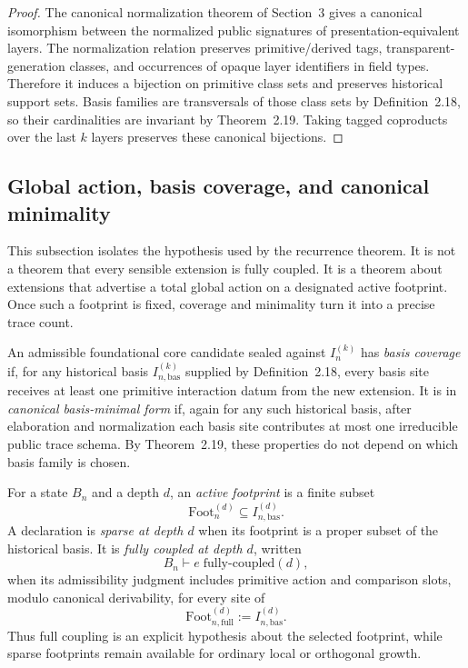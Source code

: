 \begin{proof}
The canonical normalization theorem of Section~3 gives a canonical isomorphism between the
normalized public signatures of presentation-equivalent layers.  The normalization relation
preserves primitive/derived tags, transparent-generation classes, and occurrences of opaque
layer identifiers in field types.  Therefore it induces a bijection on primitive class sets and
preserves historical support sets.  Basis families are transversals of those class sets by
Definition~2.18, so their cardinalities are invariant by Theorem~2.19.  Taking tagged
coproducts over the last \(k\) layers preserves these canonical bijections.
\end{proof}

\subsection{Global action, basis coverage, and canonical minimality}

This subsection isolates the hypothesis used by the recurrence theorem.  It is not a theorem
that every sensible extension is fully coupled.  It is a theorem about extensions that advertise
a total global action on a designated active footprint.  Once such a footprint is fixed,
coverage and minimality turn it into a precise trace count.

\begin{definition}
An admissible foundational core candidate sealed against \(I_n^{(k)}\) has \emph{basis
coverage} if, for any historical basis \(I_{n,\mathrm{bas}}^{(k)}\) supplied by
Definition~2.18, every basis site receives at least one primitive interaction datum from the
new extension.  It is in \emph{canonical basis-minimal form} if, again for any such historical
basis, after elaboration and normalization each basis site contributes at most one irreducible
public trace schema.  By Theorem~2.19, these properties do not depend on which basis family
is chosen.
\end{definition}

\begin{definition}
For a state \(B_n\) and a depth \(d\), an \emph{active footprint} is a finite subset
\[
  \mathrm{Foot}^{(d)}_n \subseteq I_{n,\mathrm{bas}}^{(d)}.
\]
A declaration is \emph{sparse at depth \(d\)} when its footprint is a proper subset of the
historical basis.  It is \emph{fully coupled at depth \(d\)}, written
\[
  B_n \vdash e\;\mathrm{fully\mbox{-}coupled}(d),
\]
when its admissibility judgment includes primitive action and comparison slots, modulo
canonical derivability, for every site of
\[
  \mathrm{Foot}^{(d)}_{n,\mathrm{full}} := I_{n,\mathrm{bas}}^{(d)}.
\]
Thus full coupling is an explicit hypothesis about the selected footprint, while sparse
footprints remain available for ordinary local or orthogonal growth.
\end{definition}

